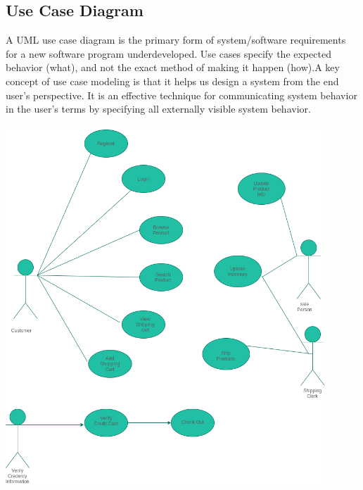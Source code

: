 \documentclass{article}
\begin{document}
\subsection{Use Case Diagram}
A UML use case diagram is the primary form of system/software requirements for a new software program underdeveloped. Use cases specify the expected behavior (what), and not the exact method of making it happen (how).A key concept of use case modeling is that it helps us design a system from the end user's perspective. It is an effective technique for communicating system behavior in the user's terms by specifying all externally visible system behavior.
 \\
\\
\vspace{5\baselineskip}
\includegraphics[width=12cm]{images/use_case.png}
\end{document}
